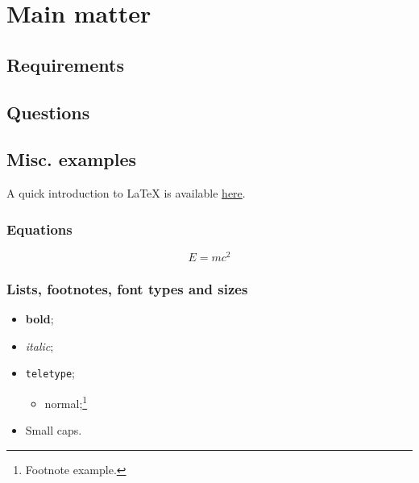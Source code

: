 \section{Main matter}

\lipsum[1]

\subsection{Requirements}



\subsection{Questions}




\subsection{Misc. examples}

A quick introduction to \LaTeX{} is available \href{https://www.overleaf.com/learn/latex/Learn_LaTeX_in_30_minutes}{here}.


\subsubsection{Equations}

\begin{equation}
  \label{eq:eq}
  E = mc^2
\end{equation}


\subsubsection{Lists, footnotes, font types and sizes}

\begin{itemize}
\item {\bf bold};
\item {\it italic};
\item {\tt teletype};
  \begin{itemize}
  \item normal;\footnote{Footnote example.}
  \end{itemize}
\item {\sc Small caps}.
\end{itemize}

